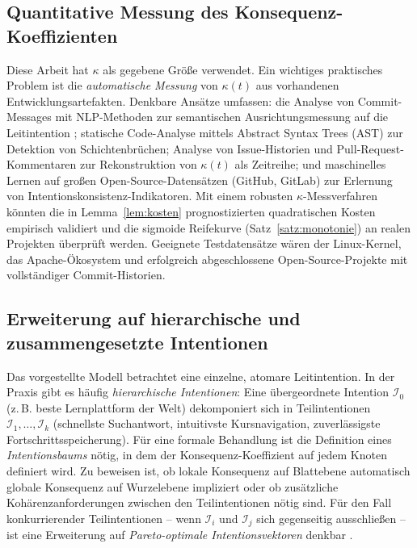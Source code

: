 ﻿\documentclass[a4paper,12pt]{article}
\theoremstyle{definition}
\begin{document}
\subsection{Quantitative Messung des Konsequenz-Koeffizienten}

Diese Arbeit hat $\kappa$ als gegebene Größe verwendet. Ein wichtiges
praktisches Problem ist die \emph{automatische Messung} von $\kappa(t)$
aus vorhandenen Entwicklungsartefakten. Denkbare Ansätze umfassen:
die Analyse von Commit-Messages mit NLP-Methoden zur semantischen
Ausrichtungsmessung auf die Leitintention \cite{devlin2019bert};
statische Code-Analyse mittels Abstract Syntax Trees (AST) zur
Detektion von Schichtenbrüchen; Analyse von Issue-Historien und
Pull-Request-Kommentaren zur Rekonstruktion von $\kappa(t)$ als
Zeitreihe; und maschinelles Lernen auf großen Open-Source-Datensätzen
(GitHub, GitLab) zur Erlernung von Intentionskonsistenz-Indikatoren.
Mit einem robusten $\kappa$-Messverfahren könnten die in Lemma~\ref{lem:kosten}
prognostizierten quadratischen Kosten empirisch validiert und die
sigmoide Reifekurve (Satz~\ref{satz:monotonie}) an realen Projekten
überprüft werden. Geeignete Testdatensätze wären der Linux-Kernel,
das Apache-Ökosystem und erfolgreich abgeschlossene Open-Source-Projekte
mit vollständiger Commit-Historien.

\subsection{Erweiterung auf hierarchische und zusammengesetzte Intentionen}

Das vorgestellte Modell betrachtet eine einzelne, atomare Leitintention.
In der Praxis gibt es häufig \emph{hierarchische Intentionen}: Eine
übergeordnete Intention $\mathcal{I}_0$ (z.\,B. \glqq{}beste Lernplattform
der Welt\grqq{}) dekomponiert sich in Teilintentionen $\mathcal{I}_1, \ldots,
\mathcal{I}_k$ (\glqq{}schnellste Suchantwort\grqq{}, \glqq{}intuitivste Kursnavigation\grqq{},
\glqq{}zuverlässigste Fortschrittsspeicherung\grqq{}). Für eine formale Behandlung
ist die Definition eines \emph{Intentionsbaums} nötig, in dem der
Konsequenz-Koeffizient auf jedem Knoten definiert wird. Zu beweisen
ist, ob lokale Konsequenz auf Blattebene automatisch globale Konsequenz
auf Wurzelebene impliziert oder ob zusätzliche Kohärenzanforderungen
zwischen den Teilintentionen nötig sind. Für den Fall konkurrierender
Teilintentionen -- wenn $\mathcal{I}_i$ und $\mathcal{I}_j$ sich gegenseitig
ausschließen -- ist eine Erweiterung auf \emph{Pareto-optimale
Intentionsvektoren} denkbar \cite{osborne1994gametheory}.
\end{document}
